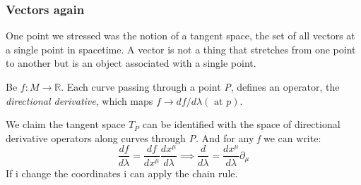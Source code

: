 \subsubsection{Vectors again}
One point we stressed was the notion of a tangent space, the set of all vectors at a single point in spacetime. A vector is not a thing that stretches from one point to another but is an object associated with a single point. \par
Be $f : M \to \mathbb{R}$. Each curve passing through a point \emph{P}, defines an operator, the \emph{ directional derivative}, which maps $f \to df/d\lambda \left( \text{ at }p \right)$. \par
We claim the tangent space $T_{P}$ can be identified with the space of directional derivative operators along curves through \emph{P}.
And for any \emph{f} we can write:
\[
\frac{df}{d\lambda } = \frac{df}{dx^{\mu }} \frac{dx^{\mu }}{d\lambda } \implies \frac{d}{d\lambda } = \frac{dx^{\mu }}{d\lambda } \partial_{\mu }
\]
If i change the coordinates i can apply the chain rule.
